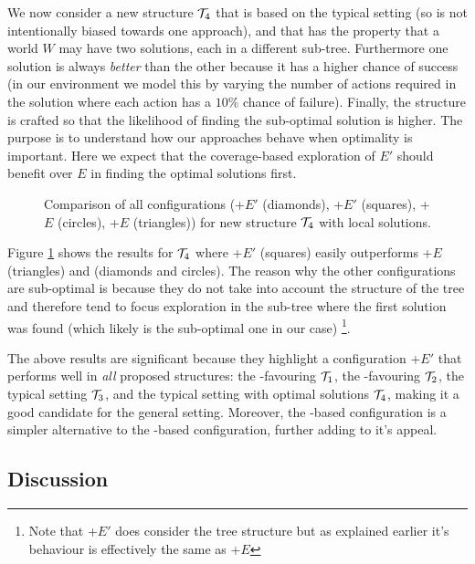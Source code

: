 We now consider a new structure ${\mathcal{T}}_4$ that is based on the typical setting (so is not intentionally biased towards one approach), and that has the property that a world $W$ may have two solutions, each in a different sub-tree. Furthermore one solution is always \textit{better} than the other because it has a higher chance of success (in our environment we model this by varying the number of actions required in the solution where each action has a $10\%$ chance of failure). Finally, the structure is crafted so that the likelihood of finding the sub-optimal solution is higher. The purpose is to understand how our approaches behave when optimality is important. Here we expect that the coverage-based exploration of $E'$ should benefit over $E$ in finding the optimal solutions first. 

\begin{figure}[ht]
\begin{center}

\end{center}
\caption{Comparison of all configurations (\BUL+$E'$ (diamonds), \CL+$E'$ (squares), \BUL+$E$ (circles), \CL+$E$ (triangles)) for new structure ${\mathcal{T}}_4$ with local solutions.}
\label{fig:T4_result}
\end{figure}

Figure \ref{fig:T4_result} shows the results for ${\mathcal{T}}_4$ where \CL+$E'$ (squares) easily outperforms \CL+$E$ (triangles) and \BUL (diamonds and circles). The reason why the other configurations are sub-optimal is because they do not take into account the structure of the tree and therefore tend to focus exploration in the sub-tree where the first solution was found (which likely is the sub-optimal one in our case) \footnote{Note that \BUL+$E'$ does consider the tree structure but as explained earlier it's behaviour is effectively the same as \BUL+$E$}.


The above results are significant because they highlight a configuration \CL+$E'$ that performs well in \textit{all} proposed structures: the \CL-favouring ${\mathcal{T}}_1$, the \BUL-favouring ${\mathcal{T}}_2$, the typical setting ${\mathcal{T}}_3$, and the typical setting with optimal solutions ${\mathcal{T}}_4$, making it a good candidate for the general setting. Moreover, the \CL-based configuration is a simpler alternative to the \BUL-based configuration, further adding to it's appeal.


\subsection{Discussion}

